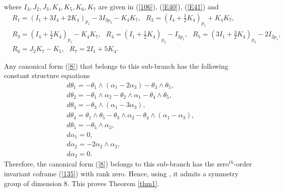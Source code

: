 \documentclass[12pt]{article}
\begin{document}
  where $I_3,J_2, J_3, K_4, K_5,K_6,K_7$ are given in (\ref{106}), (\ref{E40}), (\ref{E41})  and 
\begin{equation}\label{190}
\begin{aligned}
&R_1=(I_1+3I_4+2K_4)_{p_1}-3I_{3p_2}-K_4K_7,~~~R_2=(I_4+\frac{1}{2}K_4)_{p_1}+K_4K_7,~~~\\
&R_3=(I_4+\frac{1}{2}K_4)_{p_1}-K_4K_7, ~~~
R_4=(I_1+\frac{1}{2}K_4)_{p_2}-I_{2p_1},~~~R_5=(3I_1+\frac{3}{2}K_4)_{p_2}-2I_{2p_1},~~~\\
&R_6=J_2K_7-K_5,~~~R_7=2I_1+5K_4.
\end{aligned}
\end{equation} 





Any canonical form (\ref{8}) that belongs to this sub-branch has the following constant structure equations 
\begin{equation}
\begin{aligned}
&d\theta_1=-\theta_1\wedge(\alpha_1-2\alpha_3)-\theta_3\wedge\theta_5,\\
&d\theta_2=-\theta_1\wedge\alpha_2-\theta_2\wedge\alpha_1-\theta_4\wedge\theta_5,\\
&d\theta_3=-\theta_3\wedge(\alpha_1-3\alpha_3),\\
&d\theta_4=\theta_1\wedge\theta_5-\theta_3\wedge\alpha_2-\theta_4\wedge(\alpha_1-\alpha_3),\\
&d\theta_5=-\theta_5\wedge\alpha_3,\\
&d\alpha_1=0,\\
&d\alpha_2=-2\alpha_2\wedge\alpha_3,\\
&d\alpha_3=0.
\end{aligned}
\end{equation} 
 Therefore, the canonical form (\ref{8}) belongs to this sub-branch has the $\text{zero}^{th}$-order invariant coframe (\ref{135}) with rank zero. Hence, using \cite[Theorem 8.19, page 271, Theorem 8.22 page 275]{R6}, it admits a symmetry group of dimension $8$.  This proves Theorem \ref{thm1}.
\end{document}
